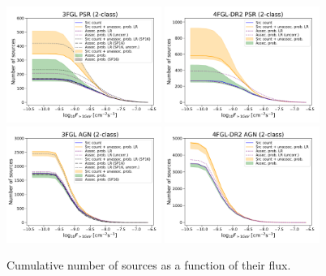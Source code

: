 \documentclass[referee]{aa} %
\begin{document}
\begin{figure}[h]
\centering
\includegraphics[width=0.45\textwidth]{plots/N_logS_3FGL_PSR_SazP_add_os.pdf}
\includegraphics[width=0.45\textwidth]{plots/N_logS_4FGL-DR2_PSR_add_os.pdf} \\
\includegraphics[width=0.45\textwidth]{plots/N_logS_3FGL_AGN_SazP_add_os.pdf}
\includegraphics[width=0.45\textwidth]{plots/N_logS_4FGL-DR2_AGN_add_os.pdf}
\caption{Cumulative number of sources as a function of their flux. 
}
\end{figure}
\end{document}

